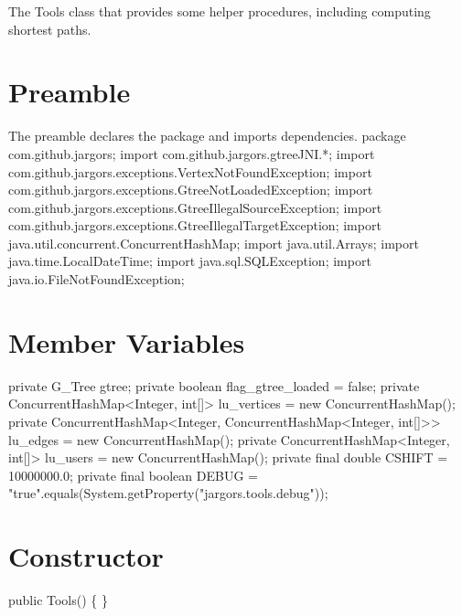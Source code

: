 The Tools class that provides some helper procedures, including computing
shortest paths.

\section{Preamble}
The preamble declares the package and imports dependencies.
\nwenddocs{}\endmoddef{}
package com.github.jargors;
import com.github.jargors.gtreeJNI.*;
import com.github.jargors.exceptions.VertexNotFoundException;
import com.github.jargors.exceptions.GtreeNotLoadedException;
import com.github.jargors.exceptions.GtreeIllegalSourceException;
import com.github.jargors.exceptions.GtreeIllegalTargetException;
import java.util.concurrent.ConcurrentHashMap;
import java.util.Arrays;
import java.time.LocalDateTime;
import java.sql.SQLException;
import java.io.FileNotFoundException;
\nwendcode{}\nwdocspar

\section{Member Variables}
\nwenddocs{}\endmoddef{}
private G_Tree gtree;
private boolean flag_gtree_loaded = false;
private ConcurrentHashMap<Integer, int[]> lu_vertices = new ConcurrentHashMap();
private ConcurrentHashMap<Integer,
    ConcurrentHashMap<Integer, int[]>>    lu_edges    = new ConcurrentHashMap();
private ConcurrentHashMap<Integer, int[]> lu_users    = new ConcurrentHashMap();
private final double CSHIFT = 10000000.0;
private final boolean DEBUG = "true".equals(System.getProperty("jargors.tools.debug"));
\nwendcode{}\nwdocspar

\section{Constructor}
\nwenddocs{}\endmoddef{}
public Tools() \{ \}
\nwendcode{}\nwdocspar

